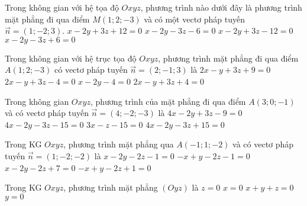 \begin{ex}%
	Trong không gian với hệ tọa độ $O x y z$, phương trình nào dưới đây là phương trình mặt phẳng đi qua điểm $M(1 ; 2 ;-3)$ và có một vectơ pháp tuyến $\vec{n}=(1 ;-2 ; 3)$.
	\choice
	{\True $x-2 y+3 z+12=0$}
	{$x-2 y-3 z-6=0$}
	{$x-2 y+3 z-12=0$}
	{$x-2 y-3 z+6=0$}
\end{ex}
\begin{ex}%
	Trong không gian với hệ trục tọa độ $Oxyz$, phương trình mặt phẳng đi qua điểm $A(1 ; 2 ;-3)$ có vectơ pháp tuyến $\vec{n}=(2 ;-1 ; 3)$ là
	\choice
	{\True $2 x-y+3 z+9=0$}
	{$2 x-y+3 z-4=0$}
	{$x-2 y-4=0$}
	{$2 x-y+3 z+4=0$}
\end{ex}

\begin{ex}%
	Trong không gian $O x y z$, phương trình của mặt phẳng đi qua điểm $A(3 ; 0 ;-1)$ và có vectơ pháp tuyến $\vec{n}=(4 ;-2 ;-3)$ là
	\choice
	{$4x-2 y+3z-9=0$}
	{\True $4x-2y-3z-15=0$}
	{$3x-z-15=0$}
	{$4x-2y-3z+15=0$}
\end{ex}

\begin{ex}%
	Trong KG $Oxyz$, phương trình mặt phẳng qua $A(-1 ; 1 ;-2)$ và có vectơ  pháp tuyến $\vec{n}=(1 ;-2 ;-2)$ là
	\choice
	{\True $x-2 y-2 z-1=0$}
	{$-x+y-2z-1=0$}
	{$x-2y-2z+7=0$}
	{$-x+y-2z+1=0$}
\end{ex}

\begin{ex}%
	Trong KG $Oxyz$, phương trình mặt phẳng $(Oyz)$ là
	\choice
	{$z=0$}
	{\True $x=0$}
	{$x+y+z=0$}
	{$y=0$}
\end{ex}

